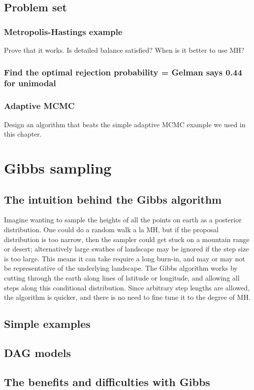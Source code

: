 \documentclass[11pt,fullpage]{book}
\begin{document}
\section{Problem set}
\subsection{Metropolis-Hastings example}
Prove that it works. Is detailed balance satisfied? When is it better to use MH?
\subsection{Find the optimal rejection probability = Gelman says 0.44 for unimodal}
\subsection{Adaptive MCMC}
Design an algorithm that beats the simple adaptive MCMC example we used in this chapter.

\chapter{Gibbs sampling}\label{chap:Gibbs}
\section{The intuition behind the Gibbs algorithm}
Imagine wanting to sample the heights of all the points on earth as a posterior distribution. One could do a random walk a la MH, but if the proposal distribution is too narrow, then the sampler could get stuck on a mountain range or desert; alternatively large swathes of landscape may be ignored if the step size is too large. This means it can take require a long burn-in, and may or may not be representative of the underlying landscape. The Gibbs algorithm works by cutting through the earth along lines of latitude or longitude, and allowing all steps along this conditional distribution. Since arbitrary step lengths are allowed, the algorithm is quicker, and there is no need to fine tune it to the degree of MH.

\section{Simple examples}
\section{DAG models}
\section{The benefits and difficulties with Gibbs}
\end{document}
